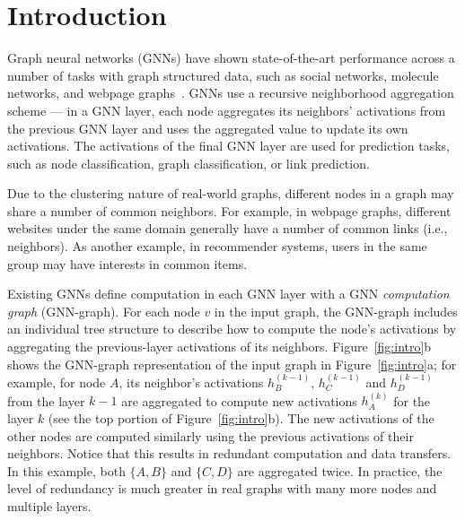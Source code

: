 \section{Introduction}
\label{sec:intro}
Graph neural networks (GNNs) have shown state-of-the-art performance across a number of tasks with graph structured data, such as social networks, molecule networks, and webpage graphs~\cite{GCN, GraphSAGE, DiffPool, GIN}. 
GNNs use a recursive neighborhood aggregation scheme --- in a GNN layer, each node aggregates its neighbors' activations from the previous GNN layer and uses the aggregated value to update its own activations.
The activations of the final GNN layer are used for prediction tasks, such as node classification, graph classification, or link prediction.

Due to the clustering nature of real-world graphs, different nodes in a graph may share a number of common neighbors.
For example, in webpage graphs, different websites under the same domain generally have a number of common links (i.e., neighbors).
As another example, in recommender systems, users in the same group may have interests in common items.

Existing GNNs define computation in each GNN layer with a GNN {\em computation graph} (GNN-graph). 
For each node $v$ in the input graph, the GNN-graph includes an individual tree structure to describe how to compute the node's activations by aggregating the previous-layer activations of its neighbors.
Figure~\ref{fig:intro}b shows the GNN-graph representation of the input graph in Figure~\ref{fig:intro}a;
for example, for node $A$, its neighbor's activations $h^{(k-1)}_B$, $h^{(k-1)}_C$ and $h^{(k-1)}_D$ from the layer $k-1$ are aggregated to compute new activations $h^{(k)}_A$ for the layer $k$ (see the top portion of Figure~\ref{fig:intro}b).
The new activations of the other nodes are computed similarly using the previous activations of their neighbors.
Notice that this results in redundant computation and data transfers. In this example, both $\{A,B\}$ and $\{C,D\}$ are aggregated twice.
In practice, the level of redundancy is much greater in real graphs with many more nodes and multiple layers.

